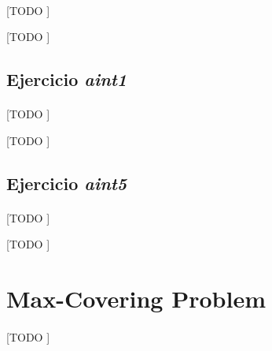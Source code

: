\documentclass[spanish]{article}
\begin{document}
			\paragraph{}
			[TODO ]

			\begin{table}[p]
				\begin{center}
				\end{center}
				\caption{[TODO ]}
				\label{}
			\end{table}

		\subsection{Ejercicio \emph{aint1}}
		\label{sec:e-6.2a}

			\paragraph{}
			[TODO ]

			\begin{table}[p]
				\begin{center}
				\end{center}
				\caption{[TODO ]}
				\label{}
			\end{table}

		\subsection{Ejercicio \emph{aint5}}
		\label{sec:e-6.2b}

			\paragraph{}
			[TODO ]

			\begin{table}[p]
				\begin{center}
				\end{center}
				\caption{[TODO ]}
				\label{}
			\end{table}

	\section{Max-Covering Problem}
	\label{sec:e-7}

		\paragraph{}
		[TODO ]
\end{document}
